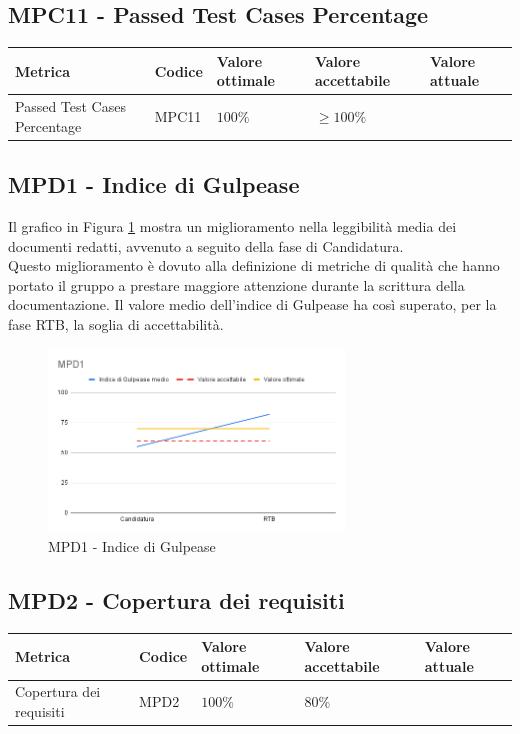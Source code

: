 \subsection{MPC11 - Passed Test Cases Percentage}
\label{s:mpc11}
\begin{table}[H]
    \centering
    \begin{tabularx}{\textwidth}{p{5.5cm}|X|l|l|l}
        \hline
		\textbf{Metrica} & \textbf{Codice} & \textbf{Valore ottimale} & \textbf{Valore accettabile}  & \textbf{Valore attuale} \\
        \hline
        Passed Test Cases Percentage    & MPC11 & $100\%$   & $\ge 100\%$ &  \\
    \end{tabularx}
\end{table}




\subsection{MPD1 - Indice di Gulpease}
\label{s:mpd1}
Il grafico in Figura \ref{fig:mpd1} mostra un miglioramento nella leggibilità media dei documenti redatti, avvenuto a seguito della fase di Candidatura.\\
Questo miglioramento è dovuto alla definizione di metriche di qualità che hanno portato il gruppo a prestare maggiore attenzione durante la scrittura della documentazione.
Il valore medio dell'indice di Gulpease ha così superato, per la fase RTB, la soglia di accettabilità.

\begin{figure}[htbp]
    \centering
    \includegraphics[width=0.7\textwidth]{img/MPD1.png}
    \caption{MPD1 - Indice di Gulpease}
    \label{fig:mpd1}
\end{figure}



\subsection{MPD2 - Copertura dei requisiti}
\label{s:mpc11}
\begin{table}[H]
    \centering
    \begin{tabularx}{\textwidth}{p{5.5cm}|X|l|l|l}
        \hline
		\textbf{Metrica} & \textbf{Codice} & \textbf{Valore ottimale} & \textbf{Valore accettabile}  & \textbf{Valore attuale} \\
        \hline
        Copertura dei requisiti & MPD2 &  $100\%$ & $80\%$  &   \\
    \end{tabularx}
\end{table}
